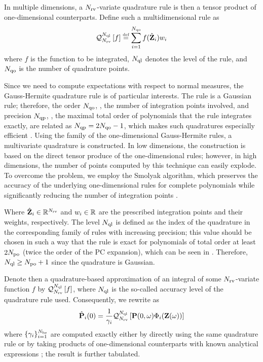 In multiple dimensions, a ${N_\text{rv}}$-variate quadrature rule is then a tensor product of one-dimensional counterparts. Define such a multidimensional rule as
\[
  \oQuad{\vars}{\qdlevel}{f} \eqdef \sum_{i = 1}^{\qdorder} f(\qdn{\vZ}_i) \qdw_i
\]
 where $f$ is the function to be integrated, $N_\text{ql}$ denotes the level of the rule, and $N_\text{qo}$ is the number of quadrature points.

Since we need to compute expectations with respect to normal measures, the Gauss-Hermite quadrature rule is of particular interests. The rule is a Gaussian rule; therefore, the order $N_\text{qo}$, \ie, the number of integration points involved, and precision $N_\text{qp}$, \ie, the maximal total order of polynomials that the rule integrates exactly, are related as $N_\text{qp} = 2 N_\text{qo} - 1$, which makes such quadratures especially efficient \cite{heiss2008}. Using the family of the one-dimensional Gauss-Hermite rules, a multivariate quadrature is constructed. In low dimensions, the construction is based on the direct tensor produce of the one-dimensional rules; however, in high dimensions, the number of points computed by this technique can easily explode. To overcome the problem, we employ the Smolyak algorithm, which preserves the accuracy of the underlying one-dimensional rules for complete polynomials while significantly reducing the number of integration points \cite{eldred2009, maitre2010, heiss2008}.

Where $\hat{\mathbf{Z}}_i \in \mathbb{R}^{N_\text{rv}}$ and $w_i \in \mathbb{R}$ are the prescribed integration points and their weights, respectively. The level $N_\text{ql}$ is defined as the index of the quadrature in the corresponding family of rules with increasing precision; this value should be chosen in such a way that the rule is exact for polynomials of total order at least $2 {N_\text{po}}$ (twice the order of the PC expansion), which can be seen in  \cite{eldred2009}. Therefore, $N_\text{ql} \geq {N_\text{po}} + 1$ since the quadrature is Gaussian.

Denote then a quadrature-based approximation of an integral of some ${N_\text{rv}}$-variate function $f$ by $\mathcal{Q}_{{N_\text{rv}}}^{N_\text{ql}}\left[f\right]$, where $N_\text{ql}$ is the so-called accuracy level of the quadrature rule used. Consequently, we rewrite  as
\[
  \hat{\mathbf{P}}_i(0) = \frac{1}{\gamma_i} \mathcal{Q}_{{N_\text{rv}}}^{N_\text{ql}}\left[\mathbf{P}(0, \omega) \Phi_i(\mathbf{Z}(\omega))\right]
\]
where $\{ \gamma_i \}_{i = 1}^{{N_\text{bs}}}$ are computed exactly either by directly using the same quadrature rule or by taking products of one-dimensional counterparts with known analytical expressions \cite{xiu2010}; the result is further tabulated.
